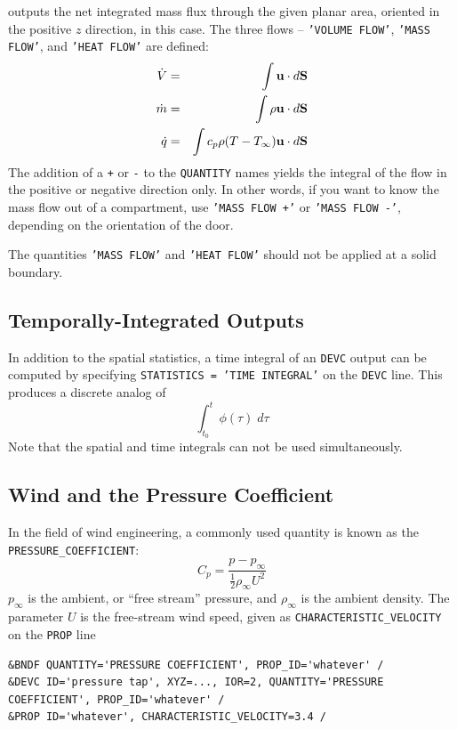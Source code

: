 \documentclass[11pt]{book}
\newcommand{\ct}{\tt\small}
\newcommand{\dS}{{d\bf S}}
\newcommand{\bu}{{\bf u}}
\newcommand{\ha}{\frac{1}{2}}
\newcommand{\be}{\begin{equation}}
\newcommand{\ee}{\end{equation}}
\begin{document}
\noindent
outputs the net integrated mass flux through the given planar area, oriented in the positive $z$ direction, in this case. The three flows -- {\ct 'VOLUME FLOW'}, {\ct 'MASS FLOW'},
and {\ct 'HEAT FLOW'} are defined:
\begin{eqnarray*} \dot{V} &=& \int \bu \cdot \dS  \\
                  \dot{m} &=& \int \rho \bu \cdot \dS \\
                  \dot{q} &=& \int c_p \rho (T-T_\infty) \bu \cdot \dS
\end{eqnarray*}
The addition of a {\ct +} or {\ct -} to the {\ct QUANTITY} names
yields the integral of the flow in the positive or negative direction
only. In other words, if you want to know the mass flow out of a
compartment, use {\ct 'MASS FLOW +'} or {\ct 'MASS FLOW -'}, depending
on the orientation of the door.

\begin{warning}
The quantities {\ct 'MASS FLOW'} and {\ct 'HEAT FLOW'} should not be applied at a solid boundary.
\end{warning}

\subsection{Temporally-Integrated Outputs}
\label{info:time_integral}

In addition to the spatial statistics, a time integral of an {\ct DEVC} output can be computed by specifying
{\ct STATISTICS = 'TIME INTEGRAL'} on the {\ct DEVC} line. This produces a discrete analog of
\be
 \int_{t_0}^t \phi(\tau) \; d\tau
\ee
Note that the spatial and time integrals can not be used simultaneously.



\subsection{Wind and the Pressure Coefficient}
\label{info:wind}

In the field of wind engineering, a commonly used quantity is known as
the {\ct PRESSURE\_COEFFICIENT}:
\be
   C_p = \frac{p-p_\infty}{\ha \rho_\infty U^2}
\ee
$p_\infty$ is the ambient, or ``free stream'' pressure, and
$\rho_\infty$ is the ambient density.  The parameter $U$ is the
free-stream wind speed, given as {\ct CHARACTERISTIC\_VELOCITY} on the
{\ct PROP} line

\footnotesize
\begin{verbatim}
&BNDF QUANTITY='PRESSURE COEFFICIENT', PROP_ID='whatever' /
&DEVC ID='pressure tap', XYZ=..., IOR=2, QUANTITY='PRESSURE COEFFICIENT', PROP_ID='whatever' /
&PROP ID='whatever', CHARACTERISTIC_VELOCITY=3.4 /
\end{verbatim}
\normalsize
\end{document}

